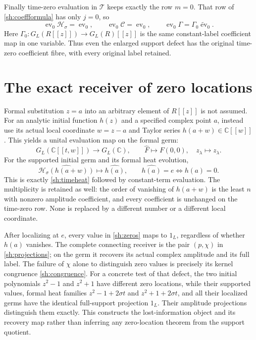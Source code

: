 \documentclass[11pt]{article}
\newcommand{\C}{\mathbb C}
\newcommand{\Ht}{\mathcal H}
\begin{document}
Finally time-zero evaluation in $\mathscr T$ keeps exactly
the row $m=0$. That row of \eqref{sh:coeffformula} has only
$j=0$, so
\begin{equation}\tag{SH39}\label{sh:coefftimezero}
 \operatorname{ev}_0\mathscr H_\sigma
   =\operatorname{ev}_0,\qquad
 \operatorname{ev}_0\mathscr C=\operatorname{ev}_0,\qquad
 \operatorname{ev}_0\Gamma
   =\Gamma_0\widetilde{\operatorname{ev}}_0.
\end{equation}
Here $\Gamma_0:G_L(R[[z]])\to G_L(R)[[z]]$ is the
same constant-label coefficient map in one variable.
Thus even the enlarged support defect has the original
time-zero coefficient fibre, with every original label retained.

\section{The exact receiver of zero locations}

Formal substitution $z=a$ into an arbitrary element of $R[[z]]$
is not assumed. For an analytic initial function $h(z)$ and a
specified complex point $a$, instead use its actual local
coordinate $w=z-a$ and Taylor series
$h(a+w)\in\C[[w]]$. This yields a unital evaluation map
on the formal germ:
\begin{equation}\tag{SH40}\label{sh:zeroreceiver}
 G_L(\C[[t,w]])\longrightarrow G_L(\C),\qquad
 \widehat F\mapsto\widehat{F(0,0)},\quad
 z_\lambda\mapsto z_\lambda.
\end{equation}
For the supported initial germ and its formal heat evolution,
\begin{equation}\tag{SH41}\label{sh:zeros}
 \widehat{\Ht_\sigma(h(a+w))}\longmapsto\widehat{h(a)},\qquad
 \widehat{h(a)}=e\iff h(a)=0 .
\end{equation}
This is exactly \eqref{sh:timeheat} followed by constant-term
evaluation. The multiplicity is retained as well: the order of
vanishing of $h(a+w)$ is the least $n$ with nonzero amplitude
coefficient, and every coefficient is unchanged on the
time-zero row. None is replaced by a different number or a
different local coordinate.

After localizing at $e$, every value in \eqref{sh:zeros} maps
to $1_L$, regardless of whether $h(a)$ vanishes. The complete
connecting receiver is the pair $(p,\chi)$ in
\eqref{sh:projections}; on the germ it recovers its actual
complex amplitude and its full label. The failure of $\chi$
alone to distinguish zero values is precisely its kernel
congruence \eqref{sh:congruence}. For a concrete test of that
defect, the two initial polynomials $z^2-1$ and $z^2+1$ have
different zero locations, while their supported values, formal
heat families $z^2-1+2\sigma t$ and $z^2+1+2\sigma t$, and
all their localized germs have the identical full-support
projection $1_L$. Their amplitude projections distinguish them
exactly. This constructs the lost-information object and its
recovery map rather than inferring any zero-location theorem
from the support quotient.
\end{document}
